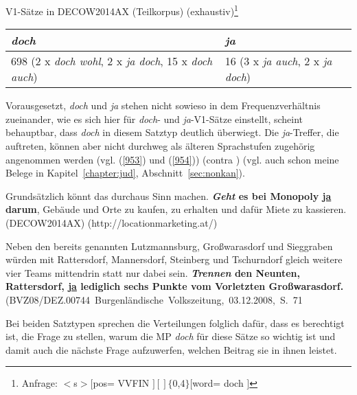 {\begin{exe}
	\ex\label{952} V1-Sätze in DECOW2014AX (Teilkorpus) (exhaustiv)\footnote{Anfrage: $<$s$>[$pos= \glqq VVFIN\grqq{} $][]\lbrace$0,4$\rbrace[$word= \glqq doch\grqq{} 		$]$}\\[-1em]
    \begin{tabular}[t]{|l|l|}
    \hline
    \textit{doch} & \textit{ja}\\
    \hline	 
    698 (2 x \textit{doch wohl}, 2 x \textit{ja doch}, 15 x \textit{doch auch}) & 16 (3 x \textit{ja auch}, 2 x \textit{ja doch})\\
    \hline
    \end{tabular}   
\end{exe}
Vorausgesetzt, \textit{doch} und \textit{ja} stehen nicht sowieso in dem Frequenzverhältnis zuein\-ander, wie es sich hier für \textit{doch}- und \textit{ja}-V1-Sätze einstellt, scheint behauptbar, dass \textit{doch} in diesem Satztyp deutlich überwiegt. Die \textit{ja}-Treffer, die auftreten, können aber nicht durchweg als älteren Sprachstufen zugehörig angenommen werden (vgl. (\ref{953}) und (\ref{954})) (contra \citealt[158]{Oennerfors1997}) (vgl. auch schon meine Belege in Kapitel~\ref{chapter:jud}, Abschnitt~\ref{sec:nonkan}).

\begin{exe}
	\ex\label{953}
	\scriptsize
	Grundsätzlich könnt das durchaus Sinn machen. \textbf{\textit{Geht} es bei Monopoly \underline{ja} darum}, Gebäude und Orte zu kaufen, zu erhalten und 		dafür Miete zu kassieren. 			      
	\hfill\hbox{(DECOW2014AX)}
	\newline  
	\hbox{}\hfill\hbox{(http://locationmarketing.at/)}
\end{exe}
								          
\begin{exe}
	\ex\label{954}
	\scriptsize
	Neben den bereits genannten Lutzmannsburg, Großwarasdorf und Sieggraben würden mit Rattersdorf, Mannersdorf, Steinberg und Tschurndorf gleich weitere 		vier Teams mittendrin statt nur dabei sein. \textbf{\textit{Trennen} den Neunten, Rattersdorf, \underline{ja} lediglich sechs Punkte vom Vorletzten 		Großwarasdorf.} 			      
	\newline  
	\hbox{}\hfill\hbox{(BVZ08/DEZ.00744 Burgenländische Volkszeitung, 03.12.2008, S. 71}
\end{exe} 
Bei beiden Satztypen sprechen die Verteilungen folglich dafür, dass es berechtigt ist, die Frage zu stellen, warum die MP \textit{doch} für diese Sätze so wichtig ist und damit auch die nächste Frage aufzuwerfen, welchen Beitrag sie in ihnen leistet.
	
}
